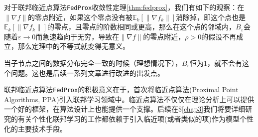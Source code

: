 \begin{rem}
对于联邦临近点算法\texttt{FedProx}收敛性定理\ref{thm:fedprox}，我们有如下的观察：在$\lVert \nabla f \rVert$的零点附近，如果这个零点没有被$\mathbb{E}_k[\lVert \nabla f_k \rVert]$消除掉，即这个点也是$\mathbb{E}_k[\lVert \nabla f_k \rVert]$的零点，且零点的阶数相同或更高，那么在这个点的邻域内，$B_{\varepsilon}$会随着$\varepsilon \to 0$而急速趋向于无穷，导致在$\lVert \nabla f \rVert$的零点附近，$\rho > 0$的假设不再成立，那么定理中的不等式就变得无意义。

当子节点之间的数据分布完全一致的时候（理想情况下），$B_{\varepsilon}$恒为1，就不会有这个问题。这也是后续一系列文章\cite{pathak2020fedsplit,tran2021feddr}进行改进的出发点。
\end{rem}

联邦临近点算法\texttt{FedProx}的积极意义在于，首次将临近点算法(Proximal Point Algorithms, PPA)引入联邦学习领域中。临近点算法不仅仅在理论分析上可以提供一个好的框架，在算法设计上也能提供一个支撑。后续在\$\ref{chap3}我们将要详细研究的有关个性化联邦学习的工作\cite{hanzely2020federated,li_2021_ditto,t2020pfedme,li2021pfedmac}都依赖于引入临近项(或者类似的项)作为模型个性化的主要技术手段。

